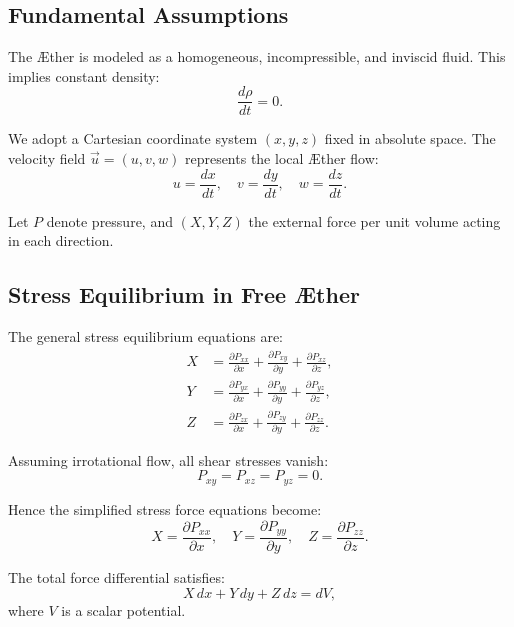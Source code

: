 \documentclass[a4paper,12pt]{article}
\begin{document}
    \subsection{Fundamental Assumptions}
    The Æther is modeled as a homogeneous, incompressible, and inviscid fluid. This implies constant density:
    \begin{equation}
        \frac{d \rho}{d t} = 0.
    \end{equation}

    We adopt a Cartesian coordinate system \((x, y, z)\) fixed in absolute space. The velocity field \(\vec{u} = (u, v, w)\) represents the local Æther flow:
    \begin{equation}
        u = \frac{dx}{dt}, \quad v = \frac{dy}{dt}, \quad w = \frac{dz}{dt}.
    \end{equation}

    Let \(P\) denote pressure, and \((X, Y, Z)\) the external force per unit volume acting in each direction.

    \subsection{Stress Equilibrium in Free Æther}
    The general stress equilibrium equations are:
    \begin{align}
        X &= \frac{\partial P_{xx}}{\partial x} + \frac{\partial P_{xy}}{\partial y} + \frac{\partial P_{xz}}{\partial z}, \\
        Y &= \frac{\partial P_{yx}}{\partial x} + \frac{\partial P_{yy}}{\partial y} + \frac{\partial P_{yz}}{\partial z}, \\
        Z &= \frac{\partial P_{zx}}{\partial x} + \frac{\partial P_{zy}}{\partial y} + \frac{\partial P_{zz}}{\partial z}.
    \end{align}

    Assuming irrotational flow, all shear stresses vanish:
    \begin{equation}
        P_{xy} = P_{xz} = P_{yz} = 0.
    \end{equation}

    Hence the simplified stress force equations become:
    \begin{equation}
        X = \frac{\partial P_{xx}}{\partial x}, \quad
        Y = \frac{\partial P_{yy}}{\partial y}, \quad
        Z = \frac{\partial P_{zz}}{\partial z}.
    \end{equation}

    The total force differential satisfies:
    \begin{equation}
        X\, dx + Y\, dy + Z\, dz = dV,
    \end{equation}
    where \(V\) is a scalar potential.
\end{document}
